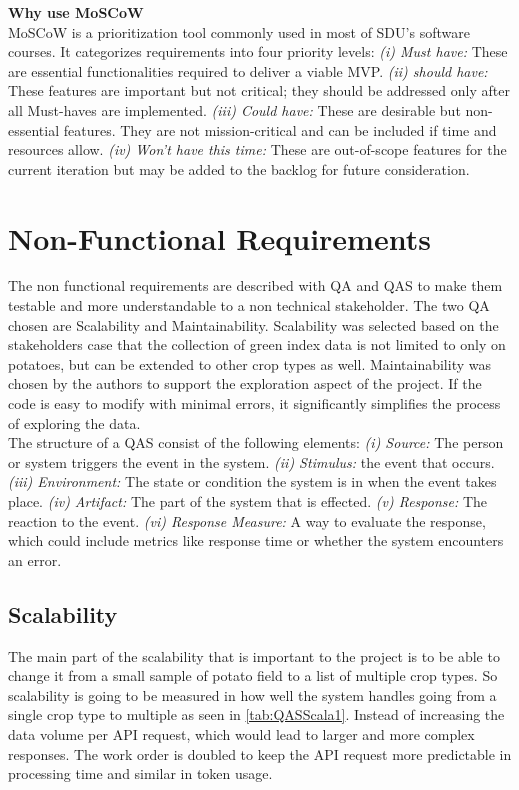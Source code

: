 \textbf{Why use MoSCoW} \\
MoSCoW is a prioritization tool commonly used in most of SDU's software courses. It categorizes requirements into four priority levels: \textit{(i) Must have:} These are essential functionalities required to deliver a viable \acrshort{MVP}. \textit{(ii) should have:} These features are important but not critical; they should be addressed only after all Must-haves are implemented. \textit{(iii) Could have:} These are desirable but non-essential features. They are not mission-critical and can be included if time and resources allow. \textit{(iv) Won't have this time:} These are out-of-scope features for the current iteration but may be added to the backlog for future consideration. 

\section{Non-Functional Requirements}\label{SE_NonFunctionalReqs}
The non functional requirements are described with \acrshort{QA} and \acrshort{QAS} to make them testable and more understandable to a non technical stakeholder\cite{bass2021software}.
The two \acrshort{QA} chosen are Scalability and Maintainability. Scalability was selected based on the stakeholders case that the collection of green index data is not limited to only on potatoes, but can be extended to other crop types as well. Maintainability was chosen by the authors to support the exploration aspect of the project. If the code is easy to modify with minimal errors, it significantly simplifies the process of exploring the data. \\
The structure of a \acrshort{QAS} consist of the following elements: \textit{(i) Source:} The person or system triggers the event in the system. \textit{(ii) Stimulus:} the event that occurs. \textit{(iii) Environment:} The state or condition the system is in when the event takes place. \textit{(iv) Artifact:} The part of the system that is effected. \textit{(v) Response:} The reaction to the event. \textit{(vi) Response Measure:} A way to evaluate the response, which could include metrics like response time or whether the system encounters an error.

\subsection{Scalability}
The main part of the scalability that is important to the project is to be able to change it from a small sample of potato field to a list of multiple crop types. 
So scalability is going to be measured in how well the system handles going from a single crop type to multiple as seen in \ref{tab:QASScala1}. Instead of increasing the data volume per API request, which would lead to larger and more complex responses. The work order is doubled to keep the API request more predictable in processing time and similar in token usage. 


